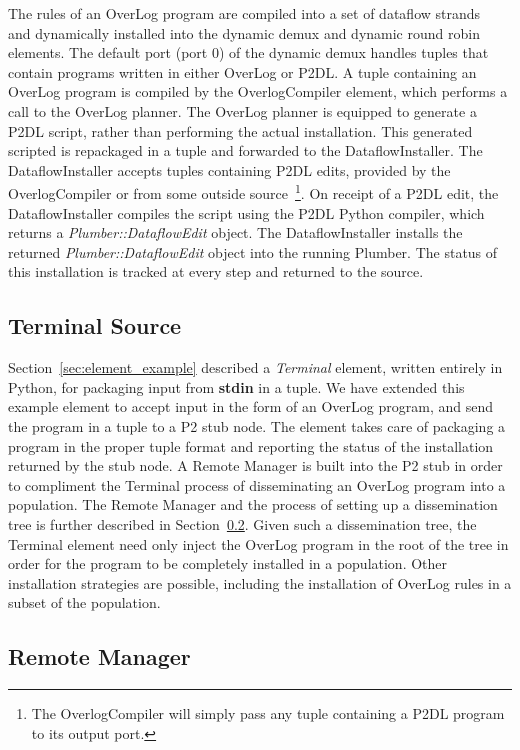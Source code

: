 \documentclass[12pt]{article}
\begin{document}
The rules of an OverLog program are compiled into a set of dataflow strands~\cite{p2:sosp} 
and dynamically installed into the dynamic demux and dynamic round robin elements. 
The default port (port 0) of the dynamic demux handles tuples that contain programs written 
in either OverLog or P2DL. A tuple containing an OverLog program is compiled by the 
OverlogCompiler element, which performs a call to the OverLog planner. The OverLog planner is 
equipped to generate a P2DL script, rather than performing the actual installation. This generated 
scripted is repackaged in a tuple and forwarded to the DataflowInstaller. The DataflowInstaller 
accepts tuples containing P2DL edits, provided by the OverlogCompiler or from some outside 
source~\footnote{The OverlogCompiler will simply pass any tuple containing a P2DL program to its 
output port.}. On receipt of a P2DL edit, the DataflowInstaller compiles the script using the P2DL 
Python compiler, which returns a \emph{Plumber::DataflowEdit} object. The DataflowInstaller 
installs the returned \emph{Plumber::DataflowEdit} object into the running Plumber. The status of this 
installation is tracked at every step and returned to the source.

\subsection{Terminal Source}
\label{sec:terminal}

Section~\ref{sec:element_example} described a \emph{Terminal} element, written entirely
in Python, for packaging input from {\bf stdin} in a tuple. We have extended this example
element to accept input in the form of an OverLog program, and send the program in a tuple
to a P2 stub node. The element takes care of packaging a program in the proper tuple format
and reporting the status of the installation returned by the stub node. A Remote Manager is
built into the P2 stub in order to compliment the Terminal process of disseminating an OverLog
program into a population. The Remote Manager and the process of setting up a dissemination
tree is further described in Section~\ref{sec:rm}. Given such a dissemination tree, the Terminal
element need only inject the OverLog program in the root of the tree in order for the program
to be completely installed in a population. Other installation strategies are possible, including
the installation of OverLog rules in a subset of the population.

\subsection{Remote Manager}
\label{sec:rm}
\end{document}
